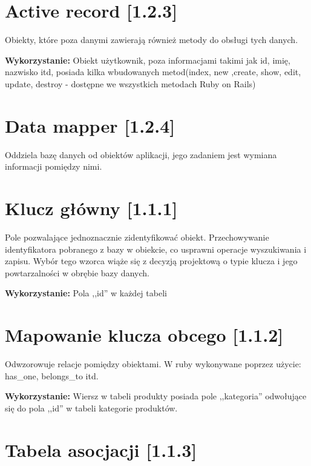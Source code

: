 \documentclass[pdflatex,11pt]{aghdpl}
\begin{document}

\section{Active record [1.2.3]}

Obiekty, które poza danymi zawierają również metody do obsługi tych danych.

\textbf{Wykorzystanie:} Obiekt użytkownik, poza informacjami takimi jak id, imię, nazwisko itd, posiada kilka wbudowanych metod(index, new ,create, show, edit, update, destroy - dostępne we wszystkich metodach Ruby on Rails)


\section{Data mapper [1.2.4]}

Oddziela bazę danych od obiektów aplikacji, jego zadaniem jest wymiana informacji pomiędzy nimi.



\section{Klucz główny [1.1.1]}

Pole pozwalające jednoznacznie zidentyfikować obiekt. Przechowywanie identyfikatora pobranego z bazy w obiekcie, co usprawni operacje wyszukiwania i zapisu. Wybór tego wzorca wiąże się z decyzją projektową o typie klucza i jego powtarzalności w obrębie bazy danych.

\textbf{Wykorzystanie:} Pola ,,id'' w każdej tabeli


\section{Mapowanie klucza obcego [1.1.2]}

Odwzorowuje relacje pomiędzy obiektami. W ruby wykonywane poprzez użycie: has\_one, belongs\_to itd.

\textbf{Wykorzystanie:} Wiersz w tabeli produkty posiada pole ,,kategoria'' odwołujące się do pola ,,id'' w tabeli kategorie produktów.


\section{Tabela asocjacji [1.1.3]}
\end{document}

